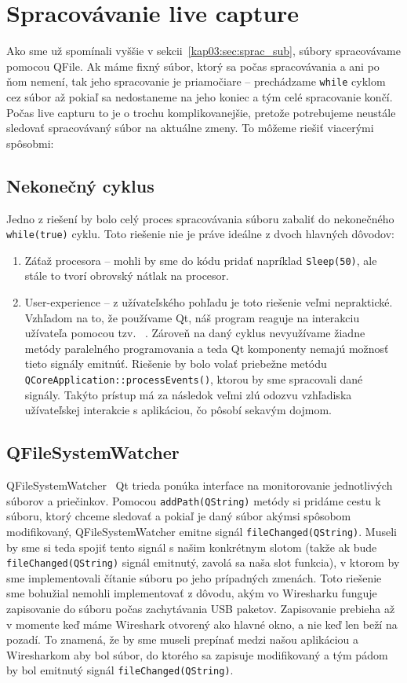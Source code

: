 \section{Spracovávanie live capture}
Ako sme už spomínali vyššie v sekcii~\ref{kap03:sec:sprac_sub}, súbory spracovávame pomocou QFile. Ak máme fixný súbor, ktorý sa počas spracovávania a ani po ňom nemení, tak jeho spracovanie je priamočiare -- prechádzame \texttt{while} cyklom cez súbor až pokiaľ sa nedostaneme na jeho koniec a tým celé spracovanie končí. Počas live capturu to je o trochu komplikovanejšie, pretože potrebujeme neustále sledovať spracovávaný súbor na aktuálne zmeny. To môžeme riešiť viacerými spôsobmi:

\subsection*{Nekonečný cyklus}
Jedno z riešení by bolo celý proces spracovávania súboru zabaliť do nekonečného \texttt{while(true)} cyklu. Toto riešenie nie je práve ideálne z dvoch hlavných dôvodov:
\begin{enumerate}
\item Záťaž procesora -- mohli by sme do kódu pridať napríklad \texttt{Sleep(50)}, ale stále to tvorí obrovský nátlak na procesor.
\item User-experience -- z užívateľského pohľadu je toto riešenie veľmi nepraktické. Vzhľadom na to, že používame Qt, náš program reaguje na interakciu užívateľa pomocou tzv. ~\cite{signal_slot}. Zároveň na daný cyklus nevyužívame žiadne metódy paralelného programovania a teda Qt komponenty nemajú možnosť tieto signály emitnúť. Riešenie by bolo volať priebežne metódu \texttt{QCoreApplication::processEvents()}, ktorou by sme spracovali dané signály. Takýto prístup má za následok veľmi zlú odozvu vzhľadiska užívateľskej interakcie s aplikáciou, čo pôsobí sekavým dojmom.
\end{enumerate}

\subsection*{QFileSystemWatcher}
QFileSystemWatcher~\cite{qfilesystemwatcher} Qt trieda ponúka interface na monitorovanie jednotlivých súborov a priečinkov. Pomocou \texttt{addPath(QString)} metódy si pridáme cestu k súboru, ktorý chceme sledovať a pokiaľ je daný súbor akýmsi spôsobom modifikovaný, QFileSystemWatcher emitne signál \texttt{fileChanged(QString)}. Museli by sme si teda spojiť tento signál s našim konkrétnym slotom (takže ak bude \texttt{fileChanged(QString)} signál emitnutý, zavolá sa naša slot funkcia), v ktorom by sme implementovali čítanie súboru po jeho prípadných zmenách. Toto riešenie sme bohužial nemohli implementovať z dôvodu, akým vo Wiresharku funguje zapisovanie do súboru počas zachytávania USB paketov. Zapisovanie prebieha až v momente keď máme Wireshark otvorený ako hlavné okno, a nie keď len beží na pozadí. To znamená, že by sme museli prepínať medzi našou aplikáciou a Wiresharkom aby bol súbor, do ktorého sa zapisuje modifikovaný a tým pádom by bol emitnutý signál \texttt{fileChanged(QString)}.

